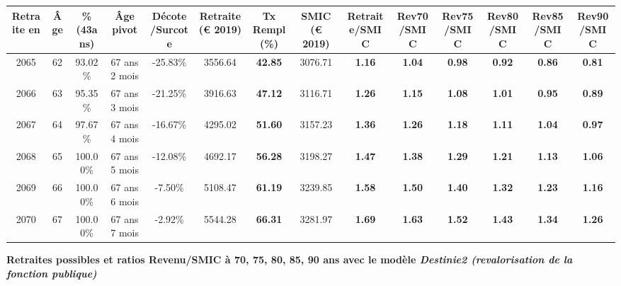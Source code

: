 \begin{adjustbox}{max width=\textwidth} 
\begin{tabular}[htb]{|c|c||c|c|c||c|c||c||c|c|c|c|c|c|} 
\hline 
 Retraite en &  Âge &  \%(43ans) &  Âge pivot &  Décote/Surcote &  Retraite (\euro{} 2019) &  Tx Rempl(\%) &  SMIC (\euro{} 2019) &  Retraite/SMIC &  Rev70/SMIC &  Rev75/SMIC &  Rev80/SMIC &  Rev85/SMIC &  Rev90/SMIC \\ 
\hline \hline 
 2065 &  62 &  93.02\% &  67 ans 2 mois &  -25.83\% &  3556.64 &  {\bf 42.85} &  3076.71 &  {\bf 1.16} &  {\bf 1.04} &  {\bf {\color{red} 0.98}} &  {\bf {\color{red} 0.92}} &  {\bf {\color{red} 0.86}} &  {\bf {\color{red} 0.81}} \\ 
\hline 
 2066 &  63 &  95.35\% &  67 ans 3 mois &  -21.25\% &  3916.63 &  {\bf 47.12} &  3116.71 &  {\bf 1.26} &  {\bf 1.15} &  {\bf 1.08} &  {\bf 1.01} &  {\bf {\color{red} 0.95}} &  {\bf {\color{red} 0.89}} \\ 
\hline 
 2067 &  64 &  97.67\% &  67 ans 4 mois &  -16.67\% &  4295.02 &  {\bf 51.60} &  3157.23 &  {\bf 1.36} &  {\bf 1.26} &  {\bf 1.18} &  {\bf 1.11} &  {\bf 1.04} &  {\bf {\color{red} 0.97}} \\ 
\hline 
 2068 &  65 &  100.00\% &  67 ans 5 mois &  -12.08\% &  4692.17 &  {\bf 56.28} &  3198.27 &  {\bf 1.47} &  {\bf 1.38} &  {\bf 1.29} &  {\bf 1.21} &  {\bf 1.13} &  {\bf 1.06} \\ 
\hline 
 2069 &  66 &  100.00\% &  67 ans 6 mois &  -7.50\% &  5108.47 &  {\bf 61.19} &  3239.85 &  {\bf 1.58} &  {\bf 1.50} &  {\bf 1.40} &  {\bf 1.32} &  {\bf 1.23} &  {\bf 1.16} \\ 
\hline 
 2070 &  67 &  100.00\% &  67 ans 7 mois &  -2.92\% &  5544.28 &  {\bf 66.31} &  3281.97 &  {\bf 1.69} &  {\bf 1.63} &  {\bf 1.52} &  {\bf 1.43} &  {\bf 1.34} &  {\bf 1.26} \\ 
\hline 
\hline 
\end{tabular} 
\end{adjustbox} 
 
 \vspace{0.1cm} 
{\bf \noindent Retraites possibles et ratios Revenu/SMIC à 70, 75, 80, 85, 90 ans avec le modèle \emph{Destinie2 (revalorisation de la fonction publique)}}  
 

